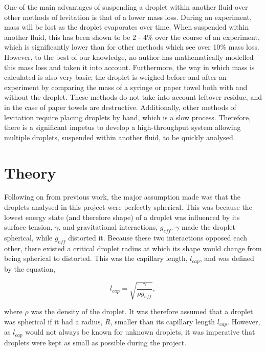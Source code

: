 \documentclass{physics_article_B}
\begin{document}
    \newpage One of the main advantages of suspending a droplet within another fluid over other methods of levitation is that of a lower mass loss. During an experiment, mass will be lost as the droplet evaporates over time. When suspended within another fluid, this has been shown\cite{harrold2} to be 2 - 4\% over the course of an experiment, which is significantly lower than for other methods which see over 10\% mass loss. However, to the best of our knowledge, no author has mathematically modelled this mass loss and taken it into account. Furthermore, the way in which mass is calculated is also very basic; the droplet is weighed before and after an experiment by comparing the mass of a syringe or paper towel both with and without the droplet\cite{temperton}. These methods do not take into account leftover residue, and in the case of paper towels are destructive. Additionally, other methods of levitation require placing droplets by hand, which is a slow process. Therefore, there is a significant impetus to develop a high-throughput system allowing multiple droplets, suspended within another fluid, to be quickly analysed.

\section{Theory\label{sect:theory}}

    Following on from previous work\cite{temperton}, the major assumption made was that the droplets analysed in this project were perfectly spherical. This was because the lowest energy state (and therefore shape) of a droplet was influenced by its surface tension, $\gamma$, and gravitational interactions, $g_{eff}$. $\gamma$ made the droplet spherical, while $g_{eff}$ distorted it. Because these two interactions opposed each other, there existed a critical droplet radius at which its shape would change from being spherical to distorted. This was the capillary length, $l_{cap}$, and was defined by the equation\cite{temperton},
        
        \begin{equation} 
        \label{eq:lcap}
            l_{cap} = \sqrt{\frac{\gamma }{\rho g_{eff} }}, 
        \end{equation}
    
    where $\rho$ was the density of the droplet. It was therefore assumed that a droplet was spherical if it had a radius, $R$, smaller than its capillary length $l_{cap}$. However, as $l_{cap}$ would not always be known for unknown droplets, it was imperative that droplets were kept as small as possible during the project. 
\end{document}
